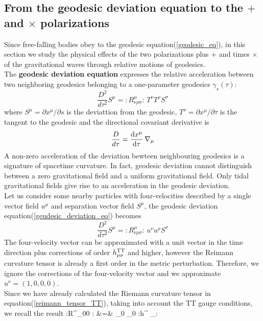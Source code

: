 \subsection{From the geodesic deviation equation to the $+$ and $\times$ polarizations}
Since free-falling bodies obey to the geodesic equation(\ref{geodesic_eq}), in this section we study the physical effects of the two polarizations plus $+$ and times $\times$ of the gravitational waves through relative motions of geodesics.\\
The \textbf{geodesic deviation equation}  expresses the relative acceleration between two neighboring geodesics belonging to a one-parameter geodesics $\gamma_s (\tau)$:
\begin{equation}
\label{geudesic_deviation_eq}
\dfrac{D^2}{d \tau ^2} S^{\mu} = :R^{\mu} _{\nu \rho \sigma}: \, T^{\nu} T^{\rho} S^{\sigma}
\end{equation}
 where $S^{\mu} = \partial x^{\mu} / \partial s$ is the deviattion from the geodesic, $T^{\nu} = \partial x^{\mu} / \partial \tau$ is the tangent to the geodesic and the directional covariant derivative is 
\[
\dfrac{D}{d \tau} = \dv{x^{\mu}}{\tau} \, \nabla_{\mu}
\]
A non-zero acceleration of the deviation bewteen neighbouring geodesics is a signature of spacetime curvature.
In fact, geodesic deviation cannot distinguish between a zero gravitational field and a uniform gravitational field. 
Only tidal gravitational fields give rise to an acceleration in the geodesic deviation. \\
Let us consider some nearby particles with four-velocities described by a single vector field $u^{\mu}$ and separation vector field $S^{\mu}$, the geodesic deviation equation(\ref{geudesic_deviation_eq}) becomes
\begin{equation}
\dfrac{D^2}{d \tau ^2} S^{\mu} = :R^{\mu} _{\nu \rho \sigma}: \, u^{\nu} u^{\rho} S^{\sigma}
\end{equation}
The four-velocity vector can be approximated with a unit vector in the time direction plus corrections of order $h^{\text{TT}} _{\mu \nu}$ and higher, however the Reimann curvature tensor is already a first order in the metric perturbation. 
Therefore, we ignore the corrections of the four-velocity vector and we approximate $u^{\nu} =(1,0,0,0)$.\\
Since we have already calculated the Riemann curvature tensor in equation(\ref{reimann_tensor_TT}), taking into account the TT gauge conditions, we recall the result
\bea
:R^\mu _{00 \sigma }: 
&=&
 \partial_0 \partial_0 :h^{\T \mu} _{\sigma}: 
